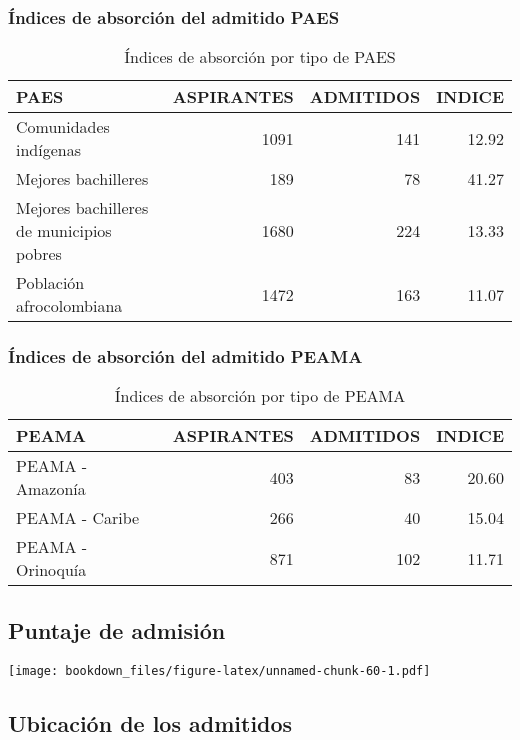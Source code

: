 \documentclass[]{article}
\theoremstyle{definition}
\theoremstyle{definition}
\theoremstyle{definition}
\theoremstyle{remark}
\begin{document}
\subsubsection{Índices de absorción del admitido
PAES}\label{indices-de-absorcion-del-admitido-paes}

\begin{table}

\caption{\label{tab:unnamed-chunk-58}Índices de absorción por tipo de PAES}
\centering
\begin{tabular}[t]{lrrr}
\toprule
PAES & ASPIRANTES & ADMITIDOS & INDICE\\
\midrule
Comunidades indígenas & 1091 & 141 & 12.92\\
Mejores bachilleres & 189 & 78 & 41.27\\
Mejores bachilleres de municipios pobres & 1680 & 224 & 13.33\\
Población afrocolombiana & 1472 & 163 & 11.07\\
\bottomrule
\end{tabular}
\end{table}

\subsubsection{Índices de absorción del admitido
PEAMA}\label{indices-de-absorcion-del-admitido-peama}

\begin{table}

\caption{\label{tab:unnamed-chunk-59}Índices de absorción por tipo de PEAMA}
\centering
\begin{tabular}[t]{lrrr}
\toprule
PEAMA & ASPIRANTES & ADMITIDOS & INDICE\\
\midrule
PEAMA - Amazonía & 403 & 83 & 20.60\\
PEAMA - Caribe & 266 & 40 & 15.04\\
PEAMA - Orinoquía & 871 & 102 & 11.71\\
\bottomrule
\end{tabular}
\end{table}

\subsection{Puntaje de admisión}\label{puntaje-de-admision}

\texttt{[image: bookdown\_files/figure-latex/unnamed-chunk-60-1.pdf]}

\subsection{Ubicación de los
admitidos}\label{ubicacion-de-los-admitidos}
\end{document}
